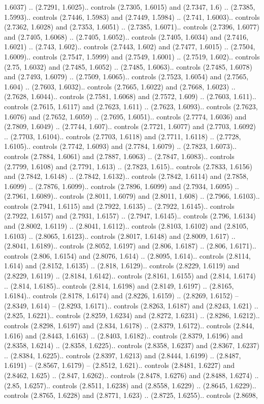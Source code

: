 1.6037) .. (2.7291, 1.6025).. controls (2.7305, 1.6015) and (2.7347, 1.6) .. (2.7385, 1.5993).. controls (2.7446, 1.5983) and (2.7449, 1.5984) .. (2.741, 1.6003).. controls (2.7362, 1.6028) and (2.7353, 1.6051) .. (2.7385, 1.6071).. controls (2.7396, 1.6077) and (2.7405, 1.6068) .. (2.7405, 1.6052).. controls (2.7405, 1.6034) and (2.7416, 1.6021) .. (2.743, 1.602).. controls (2.7443, 1.602) and (2.7477, 1.6015) .. (2.7504, 1.6009).. controls (2.7547, 1.5999) and (2.7549, 1.6001) .. (2.7519, 1.602).. controls (2.75, 1.6032) and (2.7485, 1.6052) .. (2.7485, 1.6063).. controls (2.7485, 1.6078) and (2.7493, 1.6079) .. (2.7509, 1.6065).. controls (2.7523, 1.6054) and (2.7565, 1.604) .. (2.7603, 1.6032).. controls (2.7665, 1.6022) and (2.7668, 1.6023) .. (2.7628, 1.6044).. controls (2.7581, 1.6068) and (2.7572, 1.609) .. (2.7603, 1.611).. controls (2.7615, 1.6117) and (2.7623, 1.611) .. (2.7623, 1.6093).. controls (2.7623, 1.6076) and (2.7652, 1.6059) .. (2.7695, 1.6051).. controls (2.7774, 1.6036) and (2.7809, 1.6049) .. (2.7744, 1.607).. controls (2.7721, 1.6077) and (2.7703, 1.6092) .. (2.7703, 1.6104).. controls (2.7703, 1.6118) and (2.7711, 1.6118) .. (2.7728, 1.6105).. controls (2.7742, 1.6093) and (2.7784, 1.6079) .. (2.7823, 1.6073).. controls (2.7884, 1.6061) and (2.7887, 1.6063) .. (2.7847, 1.6083).. controls (2.7799, 1.6108) and (2.7791, 1.613) .. (2.7823, 1.615).. controls (2.7833, 1.6156) and (2.7842, 1.6148) .. (2.7842, 1.6132).. controls (2.7842, 1.6114) and (2.7858, 1.6099) .. (2.7876, 1.6099).. controls (2.7896, 1.6099) and (2.7934, 1.6095) .. (2.7961, 1.6089).. controls (2.8011, 1.6079) and (2.8011, 1.608) .. (2.7966, 1.6103).. controls (2.7941, 1.6115) and (2.7922, 1.6135) .. (2.7922, 1.6145).. controls (2.7922, 1.6157) and (2.7931, 1.6157) .. (2.7947, 1.6145).. controls (2.796, 1.6134) and (2.8002, 1.6119) .. (2.8041, 1.6112).. controls (2.8103, 1.6102) and (2.8105, 1.6103) .. (2.8065, 1.6123).. controls (2.8017, 1.6148) and (2.8009, 1.617) .. (2.8041, 1.6189).. controls (2.8052, 1.6197) and (2.806, 1.6187) .. (2.806, 1.6171).. controls (2.806, 1.6154) and (2.8076, 1.614) .. (2.8095, 1.614).. controls (2.8114, 1.614) and (2.8152, 1.6135) .. (2.818, 1.6129).. controls (2.8229, 1.6119) and (2.8229, 1.6119) .. (2.8184, 1.6142).. controls (2.8161, 1.6155) and (2.814, 1.6174) .. (2.814, 1.6185).. controls (2.814, 1.6198) and (2.8149, 1.6197) .. (2.8165, 1.6184).. controls (2.8178, 1.6174) and (2.8226, 1.6159) .. (2.8269, 1.6152) -- (2.8349, 1.614) -- (2.8293, 1.6171).. controls (2.8263, 1.6187) and (2.8243, 1.621) .. (2.825, 1.6221).. controls (2.8259, 1.6234) and (2.8272, 1.6231) .. (2.8286, 1.6212).. controls (2.8298, 1.6197) and (2.834, 1.6178) .. (2.8379, 1.6172).. controls (2.844, 1.616) and (2.8443, 1.6163) .. (2.8403, 1.6182).. controls (2.8379, 1.6196) and (2.8358, 1.6214) .. (2.8358, 1.6225).. controls (2.8358, 1.6237) and (2.8367, 1.6237) .. (2.8384, 1.6225).. controls (2.8397, 1.6213) and (2.8444, 1.6199) .. (2.8487, 1.6191) -- (2.8567, 1.6179) -- (2.8512, 1.621).. controls (2.8481, 1.6227) and (2.8462, 1.625) .. (2.847, 1.6262).. controls (2.8478, 1.6276) and (2.8488, 1.6274) .. (2.85, 1.6257).. controls (2.8511, 1.6238) and (2.8558, 1.6229) .. (2.8645, 1.6229).. controls (2.8765, 1.6228) and (2.8771, 1.623) .. (2.8725, 1.6255).. controls (2.8698, 